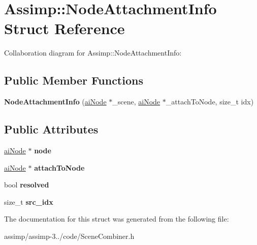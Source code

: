 \hypertarget{struct_assimp_1_1_node_attachment_info}{\section{Assimp\+:\+:Node\+Attachment\+Info Struct Reference}
\label{struct_assimp_1_1_node_attachment_info}
}


Collaboration diagram for Assimp\+:\+:Node\+Attachment\+Info\+:
\subsection*{Public Member Functions}
\begin{DoxyCompactItemize}
\item 
\hypertarget{struct_assimp_1_1_node_attachment_info_a298323abc2277b4b2b64893c0bad8135}{{\bfseries Node\+Attachment\+Info} (\hyperlink{structai_node}{ai\+Node} $\ast$\+\_\+scene, \hyperlink{structai_node}{ai\+Node} $\ast$\+\_\+attach\+To\+Node, size\+\_\+t idx)}\label{struct_assimp_1_1_node_attachment_info_a298323abc2277b4b2b64893c0bad8135}

\end{DoxyCompactItemize}
\subsection*{Public Attributes}
\begin{DoxyCompactItemize}
\item 
\hypertarget{struct_assimp_1_1_node_attachment_info_a7de12d8780fc31c69c9abc95ff4662d8}{\hyperlink{structai_node}{ai\+Node} $\ast$ {\bfseries node}}\label{struct_assimp_1_1_node_attachment_info_a7de12d8780fc31c69c9abc95ff4662d8}

\item 
\hypertarget{struct_assimp_1_1_node_attachment_info_a0251d495cd3c45897e153ecf3a5b7436}{\hyperlink{structai_node}{ai\+Node} $\ast$ {\bfseries attach\+To\+Node}}\label{struct_assimp_1_1_node_attachment_info_a0251d495cd3c45897e153ecf3a5b7436}

\item 
\hypertarget{struct_assimp_1_1_node_attachment_info_aa07184db24c9825bf472cc0e2600685f}{bool {\bfseries resolved}}\label{struct_assimp_1_1_node_attachment_info_aa07184db24c9825bf472cc0e2600685f}

\item 
\hypertarget{struct_assimp_1_1_node_attachment_info_a2b23573e4d700ade25f347734d1ce4cd}{size\+\_\+t {\bfseries src\+\_\+idx}}\label{struct_assimp_1_1_node_attachment_info_a2b23573e4d700ade25f347734d1ce4cd}

\end{DoxyCompactItemize}


The documentation for this struct was generated from the following file\+:\begin{DoxyCompactItemize}
\item 
assimp/assimp-\/3../code/Scene\+Combiner.\+h\end{DoxyCompactItemize}
